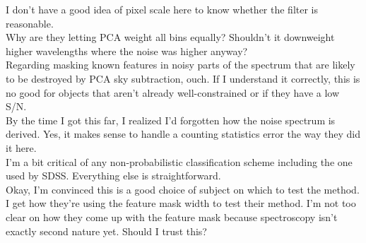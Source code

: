 \documentclass[12pt]{article}
\newcommand{\textul}{\underline}
\begin{document}
I don't have a good idea of pixel scale here to know whether the filter is reasonable.\\
Why are they letting PCA weight all bins equally?  Shouldn't it downweight higher wavelengths where the noise was higher anyway?\\
Regarding masking known features in noisy parts of the spectrum that are likely to be destroyed by PCA sky subtraction, ouch.  If I understand it correctly, this is no good for objects that aren't already well-constrained or if they have a low S/N.\\
By the time I got this far, I realized I'd forgotten how the noise spectrum is derived.  Yes, it makes sense to handle a counting statistics error the way they did it here.\\
I'm a bit critical of any non-probabilistic classification scheme including the one used by SDSS.  Everything else is straightforward.\\
Okay, I'm convinced this is a good choice of subject on which to test the method.\\
I get how they're using the feature mask width to test their method.  I'm not too clear on how they come up with the feature mask because spectroscopy isn't exactly second nature yet.  Should I trust this?\\
\end{document}
